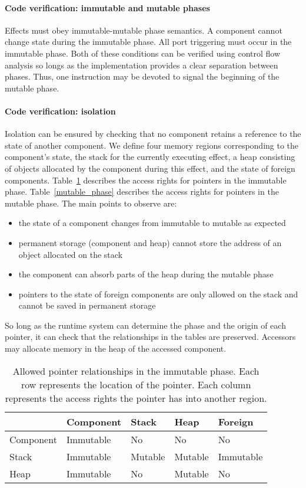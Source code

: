 \documentclass[letterpaper]{article}
\theoremstyle{definition} \newtheorem{constraint}{Constraint}
\begin{document}
\paragraph{Code verification: immutable and mutable phases}
Effects must obey immutable-mutable phase semantics.
A component cannot change state during the immutable phase.
All port triggering must occur in the immutable phase.
Both of these conditions can be verified using control flow analysis so longs as the implementation provides a clear separation between phases.
Thus, one instruction may be devoted to signal the beginning of the mutable phase.

\paragraph{Code verification: isolation}
Isolation can be ensured by checking that no component retains a reference to the state of another component.
We define four memory regions corresponding to the component's state, the stack for the currently executing effect, a heap consisting of objects allocated by the component during this effect, and the state of foreign components.
Table~\ref{immutable_phase} describes the access rights for pointers in the immutable phase.
Table~\ref{mutable_phase} describes the access rights for pointers in the mutable phase.
The main points to observe are:
\begin{itemize}
\item the state of a component changes from immutable to mutable as expected
\item permanent storage (component and heap) cannot store the address of an object allocated on the stack
\item the component can absorb parts of the heap during the mutable phase
\item pointers to the state of foreign components are only allowed on the stack and cannot be saved in permanent storage
\end{itemize}
So long as the runtime system can determine the phase and the origin of each pointer, it can check that the relationships in the tables are preserved.
Accessors may allocate memory in the heap of the accessed component.

\begin{table}
\center
\begin{tabular}{|l|l|l|l|l|}
\hline
          & Component & Stack   & Heap    & Foreign   \\
\hline
Component & Immutable & No      & No      & No        \\
\hline
Stack     & Immutable & Mutable & Mutable & Immutable \\
\hline
Heap      & Immutable & No      & Mutable & No        \\
\hline
\end{tabular}
\caption{Allowed pointer relationships in the immutable phase.  Each row represents the location of the pointer.  Each column represents the access rights the pointer has into another region.}
\label{immutable_phase}
\end{table}
\end{document}
